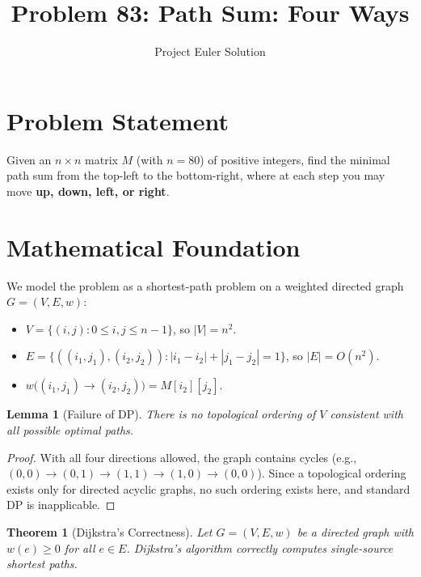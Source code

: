 \documentclass[12pt]{article}
\title{Problem 83: Path Sum: Four Ways}
\author{Project Euler Solution}
\date{}
\newtheorem{theorem}{Theorem}
\newtheorem{lemma}{Lemma}
\begin{document}
\maketitle

\section{Problem Statement}

Given an $n \times n$ matrix $M$ (with $n = 80$) of positive integers, find the minimal path sum from the top-left to the bottom-right, where at each step you may move \textbf{up, down, left, or right}.

\section{Mathematical Foundation}

We model the problem as a shortest-path problem on a weighted directed graph $G = (V, E, w)$:
\begin{itemize}
    \item $V = \{(i,j) : 0 \leq i,j \leq n-1\}$, so $|V| = n^2$.
    \item $E = \{((i_1,j_1),(i_2,j_2)) : |i_1-i_2| + |j_1-j_2| = 1\}$, so $|E| = O(n^2)$.
    \item $w\bigl((i_1,j_1) \to (i_2,j_2)\bigr) = M[i_2][j_2]$.
\end{itemize}

\begin{lemma}[Failure of DP]
There is no topological ordering of $V$ consistent with all possible optimal paths.
\end{lemma}

\begin{proof}
With all four directions allowed, the graph contains cycles (e.g., $(0,0) \to (0,1) \to (1,1) \to (1,0) \to (0,0)$). Since a topological ordering exists only for directed acyclic graphs, no such ordering exists here, and standard DP is inapplicable.
\end{proof}

\begin{theorem}[Dijkstra's Correctness]
Let $G = (V, E, w)$ be a directed graph with $w(e) \geq 0$ for all $e \in E$. Dijkstra's algorithm correctly computes single-source shortest paths.
\end{theorem}
\end{document}
